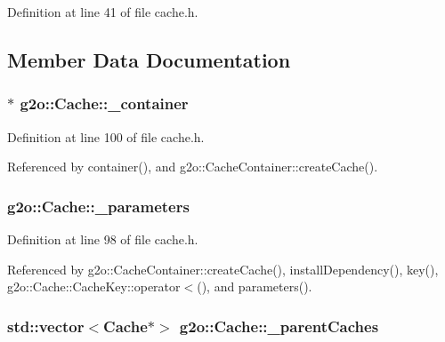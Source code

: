 Definition at line 41 of file cache.\+h.



\subsection{Member Data Documentation}
\subsubsection[{\texorpdfstring{\+\_\+container}{_container}}]{$\ast$ g2o\+::\+Cache\+::\+\_\+container\hspace{0.3cm}{\ttfamily [protected]}}\hypertarget{classg2o_1_1Cache_a098aeecd7f0daa19a58f710ae7cb27c3}{}\label{classg2o_1_1Cache_a098aeecd7f0daa19a58f710ae7cb27c3}


Definition at line 100 of file cache.\+h.



Referenced by container(), and g2o\+::\+Cache\+Container\+::create\+Cache().

\subsubsection[{\texorpdfstring{\+\_\+parameters}{_parameters}}]{ g2o\+::\+Cache\+::\+\_\+parameters\hspace{0.3cm}{\ttfamily [protected]}}\hypertarget{classg2o_1_1Cache_ad596a1a7591adece4664a43fc87b881d}{}\label{classg2o_1_1Cache_ad596a1a7591adece4664a43fc87b881d}


Definition at line 98 of file cache.\+h.



Referenced by g2o\+::\+Cache\+Container\+::create\+Cache(), install\+Dependency(), key(), g2o\+::\+Cache\+::\+Cache\+Key\+::operator$<$(), and parameters().

\subsubsection[{\texorpdfstring{\+\_\+parent\+Caches}{_parentCaches}}]{\setlength{\rightskip}{0pt plus 5cm}std\+::vector$<${\bf Cache}$\ast$$>$ g2o\+::\+Cache\+::\+\_\+parent\+Caches\hspace{0.3cm}{\ttfamily [protected]}}\hypertarget{classg2o_1_1Cache_a0b38f0c773c02903acf8964f73c3aa26}{}\label{classg2o_1_1Cache_a0b38f0c773c02903acf8964f73c3aa26}


